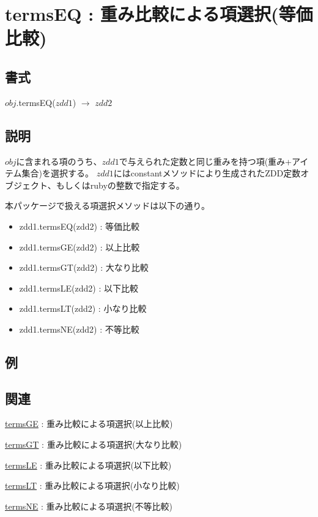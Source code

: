 
\section{termsEQ : 重み比較による項選択(等価比較)\label{sect:termsEQ}}
\subsection*{書式}
$obj$.termsEQ($zdd1$) $\rightarrow$ $zdd2$

\subsection*{説明}
$obj$に含まれる項のうち、$zdd1$で与えられた定数と同じ重みを持つ項(重み+アイテム集合)を選択する。
$zdd1$にはconstantメソッドにより生成されたZDD定数オブジェクト、もしくはrubyの整数で指定する。

本パッケージで扱える項選択メソッドは以下の通り。
\begin{itemize}
\item zdd1.termsEQ(zdd2) : 等価比較
\item zdd1.termsGE(zdd2) : 以上比較
\item zdd1.termsGT(zdd2) : 大なり比較
\item zdd1.termsLE(zdd2) : 以下比較
\item zdd1.termsLT(zdd2) : 小なり比較
\item zdd1.termsNE(zdd2) : 不等比較
\end{itemize}


\subsection*{例}


\subsection*{関連}
\hyperref[sect:termsGE]{termsGE} : 重み比較による項選択(以上比較)

\hyperref[sect:termsGT]{termsGT} : 重み比較による項選択(大なり比較)

\hyperref[sect:termsLE]{termsLE} : 重み比較による項選択(以下比較)

\hyperref[sect:termsLT]{termsLT} : 重み比較による項選択(小なり比較)

\hyperref[sect:termsNE]{termsNE} : 重み比較による項選択(不等比較)

